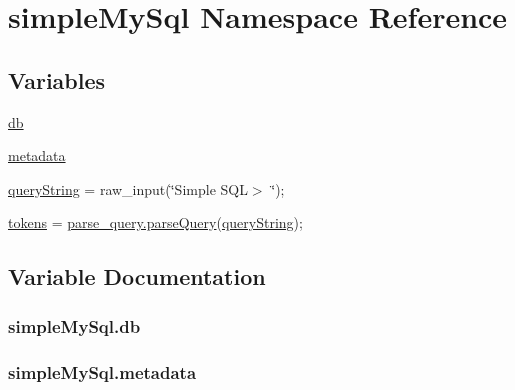 \hypertarget{namespacesimpleMySql}{}\section{simple\+My\+Sql Namespace Reference}
\label{namespacesimpleMySql}
\subsection*{Variables}
\begin{DoxyCompactItemize}
\item 
\hyperlink{namespacesimpleMySql_abdb1c48d8792a95403f4eb075977c0c3}{db}
\item 
\hyperlink{namespacesimpleMySql_af71020fe30372235a402bc7ba4f00f6d}{metadata}
\item 
\hyperlink{namespacesimpleMySql_af513a74733fc4618dc6e1cea0390040f}{query\+String} = raw\+\_\+input(\char`\"{}Simple S\+QL$>$ \char`\"{});
\item 
\hyperlink{namespacesimpleMySql_a4651e13ede722e6e54b901779260595a}{tokens} = \hyperlink{namespaceparse__query_a0771a3827bbf0ed432115ce95bcfc828}{parse\+\_\+query.\+parse\+Query}(\hyperlink{namespacesimpleMySql_af513a74733fc4618dc6e1cea0390040f}{query\+String});
\end{DoxyCompactItemize}


\subsection{Variable Documentation}
\subsubsection[{\texorpdfstring{db}{db}}]{\setlength{\rightskip}{0pt plus 5cm}simple\+My\+Sql.\+db}\hypertarget{namespacesimpleMySql_abdb1c48d8792a95403f4eb075977c0c3}{}\label{namespacesimpleMySql_abdb1c48d8792a95403f4eb075977c0c3}
\subsubsection[{\texorpdfstring{metadata}{metadata}}]{\setlength{\rightskip}{0pt plus 5cm}simple\+My\+Sql.\+metadata}\hypertarget{namespacesimpleMySql_af71020fe30372235a402bc7ba4f00f6d}{}\label{namespacesimpleMySql_af71020fe30372235a402bc7ba4f00f6d}
